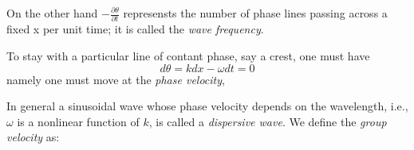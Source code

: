 \begin{center}
\end{center}
On the other hand $-\frac{\partial \theta}{\partial t}$ represensts the number of phase lines passing across a fixed x per unit time; it is called the \emph{wave frequency}.\\
\begin{center}
\end{center}
To stay with a particular line of contant phase, say a crest, one must have\\
\[d\theta = k dx -\omega dt = 0\]
namely one must move at the \emph{phase velocity},\\
\begin{center}
\end{center}
In general a sinusoidal wave whose
phase velocity depends on the wavelength, i.e.,$\omega$ is a nonlinear function of $k$, is called a \emph{dispersive wave}. We define the \emph{group velocity} as:
\begin{center}
\end{center}
